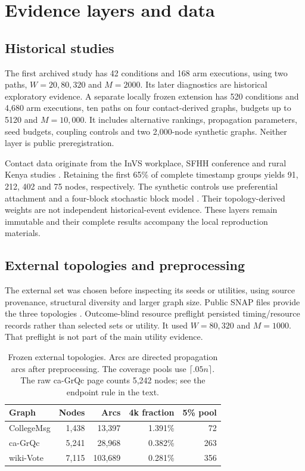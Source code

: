 \documentclass[smallextended]{svjour3}
\begin{document}
\section{Evidence layers and data}
\subsection{Historical studies}
The first archived study has 42 conditions and 168 arm executions, using two paths, $W=20,80,320$ and $M=2000$. Its later diagnostics are historical exploratory evidence. A separate locally frozen extension has 520 conditions and 4,680 arm executions, ten paths on four contact-derived graphs, budgets up to 5120 and $M=10,000$. It includes alternative rankings, propagation parameters, seed budgets, coupling controls and two 2,000-node synthetic graphs. Neither layer is public preregistration.

Contact data originate from the InVS workplace, SFHH conference and rural Kenya studies \cite{ref3,ref4,ref5,ref6}. Retaining the first 65\% of complete timestamp groups yields 91, 212, 402 and 75 nodes, respectively. The synthetic controls use preferential attachment and a four-block stochastic block model \cite{ref17,ref18}. Their topology-derived weights are not independent historical-event evidence. These layers remain immutable and their complete results accompany the local reproduction materials.

\subsection{External topologies and preprocessing}
The external set was chosen before inspecting its seeds or utilities, using source provenance, structural diversity and larger graph size. Public SNAP files provide the three topologies \cite{snap}. Outcome-blind resource preflight persisted timing/resource records rather than selected sets or utility. It used $W=80,320$ and $M=1000$. That preflight is not part of the main utility evidence.

\begin{table}[htbp]
\caption{Frozen external topologies. Arcs are directed propagation arcs after preprocessing. The coverage pools use $\lceil .05n\rceil$. The raw ca-GrQc page counts 5,242 nodes; see the endpoint rule in the text.}\label{tab:data}
\begin{tabular}{lrrrr}
\toprule
Graph & Nodes & Arcs & 4k fraction & 5\% pool \\
\midrule
CollegeMsg & 1,438 & 13,397 & 1.391\% & 72 \\
ca-GrQc & 5,241 & 28,968 & 0.382\% & 263 \\
wiki-Vote & 7,115 & 103,689 & 0.281\% & 356 \\
\bottomrule
\end{tabular}
\end{table}
\end{document}
